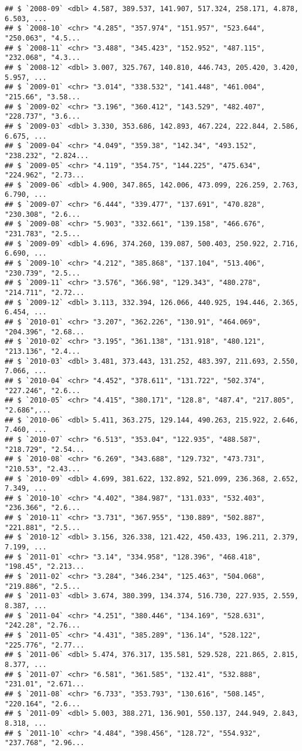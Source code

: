 \documentclass[]{article}
\begin{document}
\begin{verbatim}
## $ `2008-09` <dbl> 4.587, 389.537, 141.907, 517.324, 258.171, 4.878, 6.503, ...
## $ `2008-10` <chr> "4.285", "357.974", "151.957", "523.644", "250.063", "4.5...
## $ `2008-11` <chr> "3.488", "345.423", "152.952", "487.115", "232.068", "4.3...
## $ `2008-12` <dbl> 3.007, 325.767, 140.810, 446.743, 205.420, 3.420, 5.957, ...
## $ `2009-01` <chr> "3.014", "338.532", "141.448", "461.004", "215.66", "3.58...
## $ `2009-02` <chr> "3.196", "360.412", "143.529", "482.407", "228.737", "3.6...
## $ `2009-03` <dbl> 3.330, 353.686, 142.893, 467.224, 222.844, 2.586, 6.675, ...
## $ `2009-04` <chr> "4.049", "359.38", "142.34", "493.152", "238.232", "2.824...
## $ `2009-05` <chr> "4.119", "354.75", "144.225", "475.634", "224.962", "2.73...
## $ `2009-06` <dbl> 4.900, 347.865, 142.006, 473.099, 226.259, 2.763, 6.790, ...
## $ `2009-07` <chr> "6.444", "339.477", "137.691", "470.828", "230.308", "2.6...
## $ `2009-08` <chr> "5.903", "332.661", "139.158", "466.676", "231.783", "2.5...
## $ `2009-09` <dbl> 4.696, 374.260, 139.087, 500.403, 250.922, 2.716, 6.690, ...
## $ `2009-10` <chr> "4.212", "385.868", "137.104", "513.406", "230.739", "2.5...
## $ `2009-11` <chr> "3.576", "366.98", "129.343", "480.278", "214.711", "2.72...
## $ `2009-12` <dbl> 3.113, 332.394, 126.066, 440.925, 194.446, 2.365, 6.454, ...
## $ `2010-01` <chr> "3.207", "362.226", "130.91", "464.069", "204.396", "2.68...
## $ `2010-02` <chr> "3.195", "361.138", "131.918", "480.121", "213.136", "2.4...
## $ `2010-03` <dbl> 3.481, 373.443, 131.252, 483.397, 211.693, 2.550, 7.066, ...
## $ `2010-04` <chr> "4.452", "378.611", "131.722", "502.374", "227.246", "2.6...
## $ `2010-05` <chr> "4.415", "380.171", "128.8", "487.4", "217.805", "2.686",...
## $ `2010-06` <dbl> 5.411, 363.275, 129.144, 490.263, 215.922, 2.646, 7.460, ...
## $ `2010-07` <chr> "6.513", "353.04", "122.935", "488.587", "218.729", "2.54...
## $ `2010-08` <chr> "6.269", "343.688", "129.732", "473.731", "210.53", "2.43...
## $ `2010-09` <dbl> 4.699, 381.622, 132.892, 521.099, 236.368, 2.652, 7.349, ...
## $ `2010-10` <chr> "4.402", "384.987", "131.033", "532.403", "236.366", "2.6...
## $ `2010-11` <chr> "3.731", "367.955", "130.889", "502.887", "221.881", "2.5...
## $ `2010-12` <dbl> 3.156, 326.338, 121.422, 450.433, 196.211, 2.379, 7.199, ...
## $ `2011-01` <chr> "3.14", "334.958", "128.396", "468.418", "198.45", "2.213...
## $ `2011-02` <chr> "3.284", "346.234", "125.463", "504.068", "219.886", "2.5...
## $ `2011-03` <dbl> 3.674, 380.399, 134.374, 516.730, 227.935, 2.559, 8.387, ...
## $ `2011-04` <chr> "4.251", "380.446", "134.169", "528.631", "242.28", "2.76...
## $ `2011-05` <chr> "4.431", "385.289", "136.14", "528.122", "225.776", "2.77...
## $ `2011-06` <dbl> 5.474, 376.317, 135.581, 529.528, 221.865, 2.815, 8.377, ...
## $ `2011-07` <chr> "6.581", "361.585", "132.41", "532.888", "231.01", "2.671...
## $ `2011-08` <chr> "6.733", "353.793", "130.616", "508.145", "220.164", "2.6...
## $ `2011-09` <dbl> 5.003, 388.271, 136.901, 550.137, 244.949, 2.843, 8.318, ...
## $ `2011-10` <chr> "4.484", "398.456", "128.72", "554.932", "237.768", "2.96...
\end{verbatim}
\end{document}
